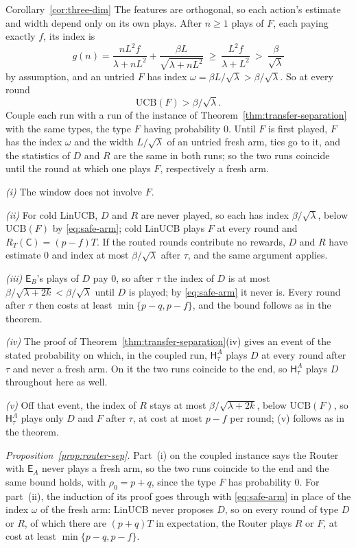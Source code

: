 \documentclass[anon]{alt2027} %
\newcommand{\Cold}{\mathsf{C}}
\newcommand{\Exp}{\mathsf{E}}
\newcommand{\Hyb}{\mathsf{H}}
\begin{document}
\begin{proofof}{Corollary~\ref{cor:three-dim}}
The features are orthogonal, so each action's estimate and width depend
only on its own plays. After $n\ge1$ plays of $F$, each paying exactly $f$,
its index is
\[
g(n)=\frac{nL^2f}{\lambda+nL^2}+\frac{\beta L}{\sqrt{\lambda+nL^2}}
\ \ge\ \frac{L^2f}{\lambda+L^2}\ >\ \frac{\beta}{\sqrt\lambda}
\]
by assumption, and an untried $F$ has index $\omega=\beta L/\sqrt\lambda>\beta/\sqrt\lambda$.
So at every round
\begin{equation}
\label{eq:safe-arm}
\mathrm{UCB}(F)>\beta/\sqrt\lambda .
\end{equation}
Couple each run with a run of the instance of
Theorem~\ref{thm:transfer-separation} with the same types, the type $F$
having probability $0$. Until $F$ is first played, $F$ has the index $\omega$
and the width $L/\sqrt\lambda$ of an untried fresh arm, ties go to it, and
the statistics of $D$ and $R$ are the same in both runs; so the two runs
coincide until the round at which one plays $F$, respectively a fresh arm.

\emph{(i)} The window does not involve $F$.

\emph{(ii)} For cold LinUCB, $D$ and $R$ are never played, so each has index
$\beta/\sqrt\lambda$, below $\mathrm{UCB}(F)$ by \eqref{eq:safe-arm}; cold
LinUCB plays $F$ at every round and $R_T(\Cold)=(p-f)T$. If the routed
rounds contribute no rewards, $D$ and $R$ have estimate $0$ and index at
most $\beta/\sqrt\lambda$ after $\tau$, and the same argument applies.

\emph{(iii)} $\Exp_B$'s plays of $D$ pay $0$, so after $\tau$ the index of
$D$ is at most $\beta/\sqrt{\lambda+2k}<\beta/\sqrt\lambda$ until $D$ is
played; by \eqref{eq:safe-arm} it never is. Every round after $\tau$ then
costs at least $\min\{p-q,p-f\}$, and the bound follows as in the theorem.

\emph{(iv)} The proof of Theorem~\ref{thm:transfer-separation}(iv) gives an
event of the stated probability on which, in the coupled run, $\Hyb^A_\tau$
plays $D$ at every round after $\tau$ and never a fresh arm. On it the two
runs coincide to the end, so $\Hyb^A_\tau$ plays $D$ throughout here as well.

\emph{(v)} Off that event, the index of $R$ stays at most
$\beta/\sqrt{\lambda+2k}$, below $\mathrm{UCB}(F)$, so $\Hyb^A_\tau$ plays only
$D$ and $F$ after $\tau$, at cost at most $p-f$ per round; (v) follows as in
the theorem.

\emph{Proposition~\ref{prop:router-sep}.} Part~(i) on the coupled instance
says the Router with $\Exp_A$ never plays a fresh arm, so the two runs
coincide to the end and the same bound holds, with $\rho_0=p+q$, since the type
$F$ has probability $0$. For part~(ii), the induction of its proof goes
through with \eqref{eq:safe-arm} in place of the index $\omega$ of the fresh
arm: LinUCB never proposes $D$, so on every round of type $D$ or $R$, of which
there are $(p+q)T$ in expectation, the Router plays $R$ or $F$, at cost at
least $\min\{p-q,p-f\}$.
\end{proofof}
\end{document}

